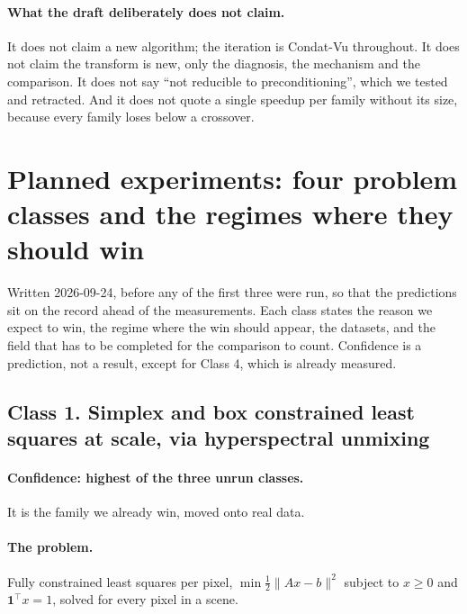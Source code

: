 \documentclass[11pt]{article}
\begin{document}
\paragraph{What the draft deliberately does not claim.}
It does not claim a new algorithm; the iteration is Condat-Vu throughout. It
does not claim the transform is new, only the diagnosis, the mechanism and
the comparison. It does not say ``not reducible to preconditioning'', which
we tested and retracted. And it does not quote a single speedup per family
without its size, because every family loses below a crossover.

\section{Planned experiments: four problem classes and the regimes where they should win}
\label{app:log:classes}

Written 2026-09-24, before any of the first three were run, so that the
predictions sit on the record ahead of the measurements. Each class states the
reason we expect to win, the regime where the win should appear, the datasets,
and the field that has to be completed for the comparison to count. Confidence
is a prediction, not a result, except for Class 4, which is already measured.

\subsection{Class 1. Simplex and box constrained least squares at scale, via
hyperspectral unmixing}

\paragraph{Confidence: highest of the three unrun classes.} It is the family we
already win, moved onto real data.

\paragraph{The problem.} Fully constrained least squares per pixel,
$\min \tfrac12\|Ax-b\|^2$ subject to $x \ge 0$ and $\mathbf{1}^\top x = 1$,
solved for every pixel in a scene.
\end{document}
